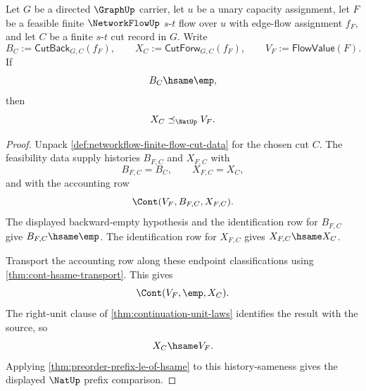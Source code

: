 \begin{lemma}
\label{lem:networkflow-empty-backward-accounting-cut-flow-below-value}
Let $G$ be a directed $\GraphUp$ carrier, let $u$ be a unary capacity assignment, let $F$ be a feasible finite $\NetworkFlowUp$ $s$-$t$ flow over $u$ with edge-flow assignment $f_F$, and let $C$ be a finite $s$-$t$ cut record in $G$. Write
$$
B_C:=\mathsf{CutBack}_{G,C}(f_F),
\qquad
X_C:=\mathsf{CutForw}_{G,C}(f_F),
\qquad
V_F:=\mathsf{FlowValue}(F).
$$
If
$$
B_C\hsame\emp,
$$
then
$$
X_C
\preceq_{\NatUp}
V_F.
$$
\end{lemma}
\begin{proof}
Unpack \autoref{def:networkflow-finite-flow-cut-data} for the chosen cut $C$. The feasibility data supply histories $B_{F,C}$ and $X_{F,C}$ with
$$
B_{F,C}=B_C,
\qquad
X_{F,C}=X_C,
$$
and with the accounting row
$$
\Cont(V_F,B_{F,C},X_{F,C}).
$$
The displayed backward-empty hypothesis and the identification row for $B_{F,C}$ give $B_{F,C}\hsame\emp$. The identification row for $X_{F,C}$ gives $X_{F,C}\hsame X_C$.

Transport the accounting row along these endpoint classifications using \autoref{thm:cont-hsame-transport}. This gives
$$
\Cont(V_F,\emp,X_C).
$$
The right-unit clause of \autoref{thm:continuation-unit-laws} identifies the result with the source, so
$$
X_C\hsame V_F.
$$
Applying \autoref{thm:preorder-prefix-le-of-hsame} to this history-sameness gives the displayed $\NatUp$ prefix comparison.
\end{proof}

